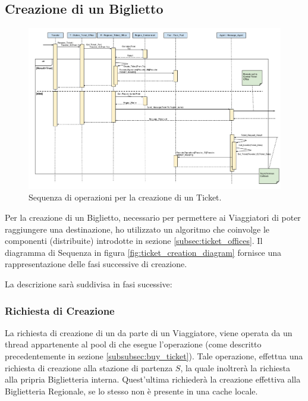 \newpage
\subsection{Creazione di un Biglietto}

	\begin{figure}[htbp]
		\includegraphics[trim = 80mm 10mm 10mm 10mm,scale=0.34]{imgs/Buy_Ticket_Sequence_Diagram.pdf}
		\caption{\footnotesize{Sequenza di operazioni per la creazione di un Ticket.}}
	\end{figure}

Per la creazione di un Biglietto, necessario per permettere ai Viaggiatori di poter raggiungere una destinazione, ho utilizzato un algoritmo che coinvolge le componenti (distribuite) introdotte in sezione \ref{subsec:ticket_offices}.
Il diagramma di Sequenza in figura \ref{fig:ticket_creation_diagram} fornisce una rappresentazione delle fasi successive di creazione.


La descrizione sarà suddivisa in fasi sucessive:

	\subsubsection {Richiesta di Creazione}
	
	La richiesta di creazione di un  da parte di un Viaggiatore, viene operata da un thread appartenente al pool di  che esegue l'operazione  (come descritto precedentemente in sezione \ref{subsubsec:buy_ticket}). Tale operazione, effettua una richiesta di creazione alla stazione di partenza $S$, la quale inoltrerà la richiesta alla pripria Biglietteria interna. Quest'ultima richiederà la creazione effettiva alla Biglietteria Regionale, se lo stesso  non è presente in una cache locale.  
	
